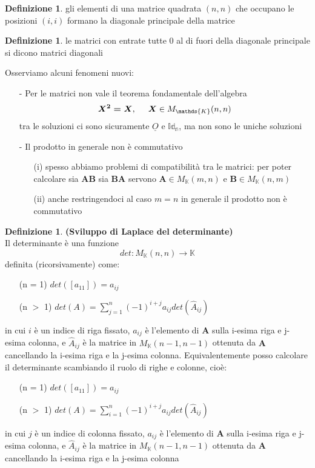 \documentclass[a4paper, 12pt]{article}
\theoremstyle{definition}
\newtheorem{defn}[thm]{Definizione}
\begin{document}
\begin{defn}
    gli elementi di una matrice quadrata $(n,n)$ che occupano le posizioni $(i,i)$ formano la diagonale principale della matrice
\end{defn}
\begin{defn}
    le matrici con entrate tutte 0 al di fuori della diagonale principale si dicono matrici diagonali
\end{defn}
\noindent Osserviamo alcuni fenomeni nuovi:
\begin{itemize}
\item [-] Per le matrici non vale il teorema fondamentale dell'algebra
\[ \boldsymbol{X^2 = X}, \hspace{0.5cm} \boldsymbol{X} \in M_\mathds{K}(n,n) \]
tra le soluzioni ci sono sicuramente $\underline{O}$ e $\mathds{Id_n}$, ma non sono le uniche soluzioni
\item [-] Il prodotto in generale non è commutativo
\begin{itemize}
    \item [(i)] spesso abbiamo problemi di compatibilità tra le matrici: per poter calcolare sia $\boldsymbol{AB}$ sia $\boldsymbol{BA}$ servono $\boldsymbol{A} \in M_\mathds{K}(m,n)$ e $\boldsymbol{B} \in M_\mathds{K}(n,m)$
    \item [(ii)] anche restringendoci al caso $m = n$ in generale il prodotto non è commutativo
\end{itemize}
\end{itemize}
\newpage
\begin{defn} \textbf{(Sviluppo di Laplace del determinante)} \\
    Il determinante è una funzione 
    \[ det: M_{\mathds{K}}(n,n)\rightarrow\mathds{K} \]
    definita (ricorsivamente) come: 
    \begin{itemize}
        \item [(n = 1)] $det([a_{11}]) = a_{ij}$
        \item [(n $>$ 1)] $det(A) = \sum\limits_{j=1}^{n}(-1)^{i+j}a_{ij}det(\hat{A}_{ij})$
    \end{itemize}
    in cui $i$ è un indice di riga fissato, $a_{ij}$ è l'elemento di $\boldsymbol{A}$ sulla i-esima riga e j-esima colonna, e $\hat{A}_{ij}$ è la matrice in $M_\mathds{K}(n-1, n-1)$ ottenuta da $\boldsymbol{A}$ cancellando la i-esima riga e la j-esima colonna.  \medbreak
    \medbreak
    \noindent Equivalentemente posso calcolare il determinante scambiando il ruolo di righe e colonne, cioè:  \medbreak
    \begin{itemize}
        \item [(n = 1)] $det([a_{11}]) = a_{ij}$
        \item [(n $>$ 1)] $det(A) = \sum\limits_{i=1}^{n}(-1)^{i+j}a_{ij}det(\hat{A}_{ij})$
    \end{itemize}
    in cui $j$ è un indice di colonna fissato, $a_{ij}$ è l'elemento di $\boldsymbol{A}$ sulla i-esima riga e j-esima colonna, e $\hat{A}_{ij}$ è la matrice in $M_\mathds{K}(n-1, n-1)$ ottenuta da $\boldsymbol{A}$ cancellando la i-esima riga e la j-esima colonna
\end{defn}
\medbreak
\end{document}
